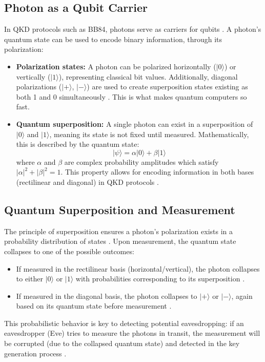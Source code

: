 \documentclass{article}
\begin{document}
\subsection{Photon as a Qubit Carrier}
In QKD protocols such as BB84, photons serve as carriers for qubits \cite{bennett1984}. A photon's quantum state can be used to encode binary information, through its polarization:
\begin{itemize}
    \item \textbf{Polarization states:} A photon can be polarized horizontally ($|0\rangle$) or vertically ($|1\rangle$), representing classical bit values. Additionally, diagonal polarizations ($|+\rangle$, $|-\rangle$) are used to create superposition states existing as both 1 and 0 simultaneously \cite{nielsen2010}. This is what makes quantum computers so fast. 
    \item \textbf{Quantum superposition:} A single photon can exist in a superposition of $|0\rangle$ and $|1\rangle$, meaning its state is not fixed until measured. Mathematically, this is described by the quantum state:
    \[
    |\psi\rangle = \alpha |0\rangle + \beta |1\rangle
    \]
    where $\alpha$ and $\beta$ are complex probability amplitudes which satisfy $|\alpha|^2 + |\beta|^2 = 1$. This property allows for encoding information in both bases (rectilinear and diagonal) in QKD protocols \cite{nielsen2010}.
\end{itemize}

\subsection{Quantum Superposition and Measurement}
The principle of superposition ensures a photon's polarization exists in a probability distribution of states \cite{yin2017}. Upon measurement, the quantum state collapses to one of the possible outcomes:
\begin{itemize}
    \item If measured in the rectilinear basis (horizontal/vertical), the photon collapses to either $|0\rangle$ or $|1\rangle$ with probabilities corresponding to its superposition \cite{patel2020}.
    \item If measured in the diagonal basis, the photon collapses to $|+\rangle$ or $|-\rangle$, again based on its quantum state before measurement \cite{nielsen2010}.
\end{itemize}
This probabilistic behavior is key to detecting potential eavesdropping: if an eavesdropper (Eve) tries to measure the photons in transit, the measurement will be corrupted (due to the collapsed quantum state) and detected in the key generation process \cite{scarani2014}.
\end{document}
